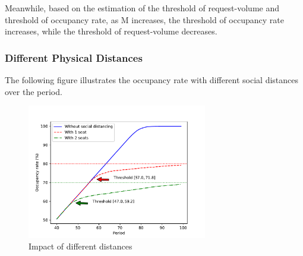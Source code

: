 Meanwhile, based on the estimation of the threshold of request-volume and threshold of occupancy rate, as M increases, the threshold of occupancy rate increases, while the threshold of request-volume decreases.




\subsubsection{Different Physical Distances}
The following figure illustrates the occupancy rate with different social distances over the period.

\begin{figure}[h]
  \caption{Impact of different distances}
  \centering
    \includegraphics[width=0.7\textwidth]{./Figures/distance_3.pdf}
\end{figure}


